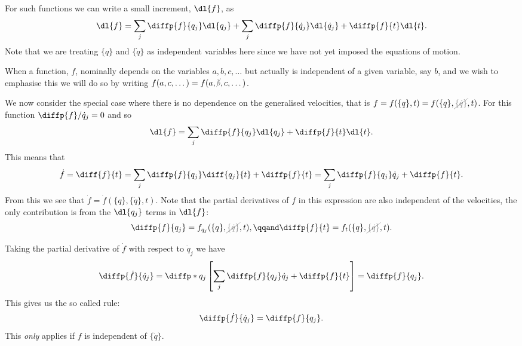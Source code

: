 \documentclass[fleqn]{NotesClass}
\newcommand*{\nodependence}[1]{\textcolor{gray}{\cancel{#1}}}
\begin{document}
    For such functions we can write a small increment, \(\dl{f}\), as
    \begin{equation}
        \dl{f} = \sum_j \diffp{f}{q_j} \dl{q_j} + \sum_j \diffp{f}{\dot{q}_j} \dl{\dot{q}_j} + \diffp{f}{t}\dl{t}.
    \end{equation}
    Note that we are treating \(\{q\}\) and \(\{\dot{q}\}\) as independent variables here since we have not yet imposed the equations of motion.
    
    \begin{ntn}{}{}
        When a function, \(f\), nominally depends on the variables \(a, b, c, \dotsc\) but actually is independent of a given variable, say \(b\), and we wish to emphasise this we will do so by writing \(f(a, c, \dotsc) = f(a, \nodependence{b}, c, \dotsc)\).
    \end{ntn}
    
    We now consider the special case where there is no dependence on the generalised velocities, that is \(f = f(\{q\}, t) = f(\{q\}, \nodependence{\{\dot{q}\}}, t)\).
    For this function \(\diffp{f}/{\dot{q}_j} = 0\) and so
    \begin{equation}
        \dl{f} = \sum_j \diffp{f}{q_j} \dl{q_j} + \diffp{f}{t}\dl{t}.
    \end{equation}
    This means that
    \begin{equation}
        \dot{f} = \diff{f}{t} = \sum_j \diffp{f}{q_j}\diff{q_j}{t} + \diffp{f}{t} = \sum_j \diffp{f}{q_j}\dot{q}_j + \diffp{f}{t}.
    \end{equation}
    From this we see that \(\dot{f} = \dot{f}(\{q\}, \{\dot{q}\}, t)\).
    Note that the partial derivatives of \(f\) in this expression are also independent of the velocities, the only contribution is from the \(\dl{q_j}\) terms in \(\dl{f}\):
    \begin{equation}
        \diffp{f}{q_j} = f_{q_j}(\{q\}, \nodependence{\{\dot{q}\}}, t), \qqand \diffp{f}{t} = f_t(\{q\}, \nodependence{\{\dot{q}\}}, t).
    \end{equation}
    
    Taking the partial derivative of \(\dot{f}\) with respect to \(\dot{q}_j\) we have
    \begin{equation}
        \diffp{\dot{f}}{\dot{q}_j} = \diffp*{}{q_j} \left[ \sum_j \diffp{f}{q_j}\dot{q}_j + \diffp{f}{t} \right] = \diffp{f}{q_j}.
    \end{equation}
    This gives us the so called  rule:
    \begin{equation}\label{eqn:cancellation of dots}
        \diffp{\dot{f}}{\dot{q}_j} = \diffp{f}{q_j}.
    \end{equation}
    This \emph{only} applies if \(f\) is independent of \(\{\dot{q}\}\).
    
\end{document}
